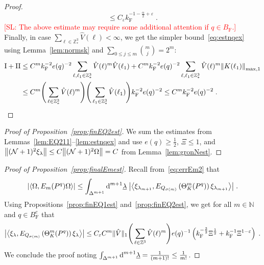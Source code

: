 \documentclass[12pt,a4paper]{article}
\numberwithin{equation}{section}
\newcommand{\1}{\mathbb{I}}
\newcommand{\di}{\textnormal{d}}
\newcommand{\F}{\mathrm{F}}
\newcommand{\I}{\mathrm{I}}
\newcommand{\II}{\mathrm{II}}
\newcommand{\Z}{\mathbb{Z}}
\newcommand{\NN}{\mathcal{N}}
\newcommand{\half}{\frac{1}{2}}
\newcommand{\eva}[1]{\left\langle #1 \right\rangle}
\theoremstyle{plain}
\theoremstyle{definition}
\theoremstyle{remark}
\theoremstyle{plain}
\theoremstyle{definition}
\theoremstyle{remark}
\begin{document}
\begin{proof}
\begin{equation}
	\leq C_\varepsilon k_{\F}^{-1 - \frac{\alpha}{2} + \varepsilon} \;.
\end{equation}
\textcolor{red}{[SL: The above estimate may require some additional attention if $ q \in B_{\F} $.]}
Finally, in case $ \sum_{\ell \in \Z^3_*} \hat{V}(\ell) < \infty $, we get the simpler bound~\eqref{eq:estnqex} using Lemma~\ref{lem:normsk} and $ \sum_{0 \le j \le m} {{m}\choose j} = 2^m $:
\begin{align}
	\I + \II
	&\leq C^m k_{\F}^{-2} e(q)^{-2} \sum_{\ell,\ell_1 \in \Z^3_*}
		\hat{V}(\ell)^m
		\hat{V}(\ell_1)
	+ C^m k_{\F}^{-2} e(q)^{-2} \sum_{\ell,\ell_1 \in \Z^3_*}
		\hat{V}(\ell)^m
		\norm{K(\ell_1)}_{\max,1} \nonumber\\
	&\leq C^m
		\Bigg( \sum\limits_{\ell \in \Z^3_*} \hat{V}(\ell)^m \Bigg)
		\Bigg( \sum\limits_{\ell_1 \in \Z^3_*} \hat{V}(\ell_1) \Bigg)
		k_{\F}^{-2} e(q)^{-2}
	\leq C^m k_{\F}^{-2} e(q)^{-2} \;.
\end{align}
\end{proof}



\begin{proof}[Proof of Proposition~\ref{prop:finEQ2est}]
We sum the estimates from Lemmas~\ref{lem:EQ211}--\ref{lem:estnqex} and use $ e(q) \ge \half $, $ \Xi \le 1 $, and $ \norm{(\NN+1)^2 \xi_\lambda} \le C \norm{(\NN+1)^2 \Omega} = C $ from Lemma~\ref{lem:gronNest}.
\end{proof}



\begin{proof}[Proof of Proposition~\ref{prop:finalEmest}]
Recall from~\eqref{eq:errEm2} that
\begin{equation}
	\abs{\eva{\Omega, E_m(P^q) \Omega }}
	\le \int_{\Delta^{m+1}} \di^{m+1}\underline{\lambda} \;
		\abs{\eva{\xi_{\lambda_{m+1}}, E_{Q_{\sigma(m)}}\left(\Theta^{m}_{K}(P^q)\right) \xi_{\lambda_{m+1}}}} \;.
\end{equation}		
Using Propositions~\ref{prop:finEQ1est} and~\ref{prop:finEQ2est}, we get for all $ m \in \mathbb{N} $ and $ q \in B_{\F}^c $ that
\begin{equation}
	\abs{\eva{\xi_\lambda, E_{Q_{\sigma(m)}}\left(\Theta^{m}_{K}(P^q)\right) \xi_\lambda}}
	\le C_\varepsilon C^m \Vert \hat{V} \Vert_1
		\Bigg( \sum_{\ell \in \Z^3} \hat{V}(\ell)^m \Bigg)
		e(q)^{-1} \left( k_{\F}^{-\frac{3}{2}} \Xi^\half
		+ k_{\F}^{-1}\Xi^{1-\varepsilon} \right) \;.
\end{equation}
We conclude the proof noting $ \int_{\Delta^{m+1}} \di^{m+1} \underline{\lambda} = \frac{1}{(m+1)!} \le \frac{1}{m!} $.
\end{proof}
\end{document}
